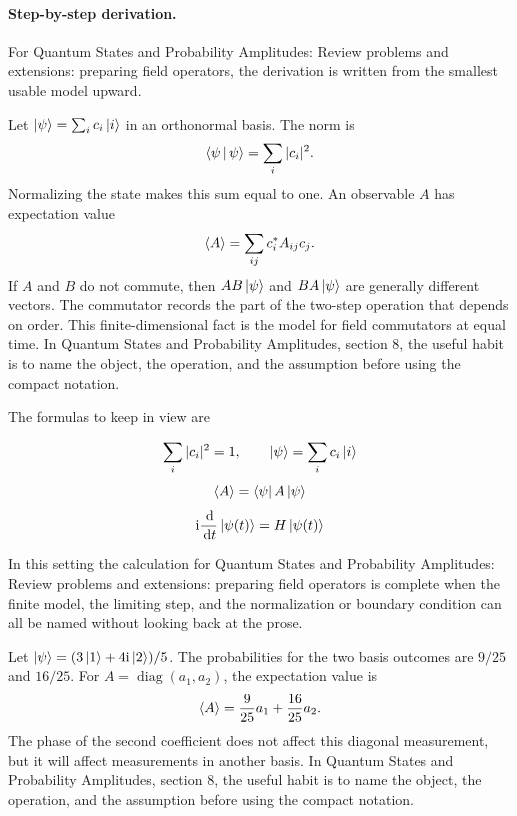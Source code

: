 \paragraph{Step-by-step derivation.}

For Quantum States and Probability Amplitudes: Review problems and extensions: preparing field operators, the derivation is written from the smallest usable model upward.

Let \(\left|\psi\right\rangle=\sum_i c_i\left|i\right\rangle\) in an orthonormal basis.  The norm is
\[
  \left\langle \psi\,\middle|\,\psi\right\rangle=\sum_i |c_i|^2.
\]
Normalizing the state makes this sum equal to one.  An observable \(A\) has expectation value
\[
  \left\langle A\right\rangle=\sum_{ij}c_i^*A_{ij}c_j.
\]
If \(A\) and \(B\) do not commute, then \(AB\left|\psi\right\rangle\) and \(BA\left|\psi\right\rangle\) are generally different vectors.  The commutator records the part of the two-step operation that depends on order.  This finite-dimensional fact is the model for field commutators at equal time.  In Quantum States and Probability Amplitudes, section 8, the useful habit is to name the object, the operation, and the assumption before using the compact notation.

The formulas to keep in view are

\[
  \sum_i |c_i|^2=1,\qquad \left|\psi\right\rangle=\sum_i c_i\left|i\right\rangle
\]
\[
  \left\langle A\right\rangle=\left\langle \psi\right|A\left|\psi\right\rangle
\]
\[
  \mathrm i\frac{\,\mathrm d}{\,\mathrm d t}\left|\psi(t)\right\rangle=H\left|\psi(t)\right\rangle
\]

In this setting the calculation for Quantum States and Probability Amplitudes: Review problems and extensions: preparing field operators is complete when the finite model, the limiting step, and the normalization or boundary condition can all be named without looking back at the prose.




\begin{example}
Let \(\left|\psi\right\rangle=(3\left|1\right\rangle+4\mathrm i\left|2\right\rangle)/5\).  The probabilities for the two basis outcomes are \(9/25\) and \(16/25\).  For \(A=\operatorname{diag}(a_1,a_2)\), the expectation value is
\[
  \left\langle A\right\rangle=\frac{9}{25}a_1+\frac{16}{25}a_2.
\]
The phase of the second coefficient does not affect this diagonal measurement, but it will affect measurements in another basis.  In Quantum States and Probability Amplitudes, section 8, the useful habit is to name the object, the operation, and the assumption before using the compact notation.
\end{example}



